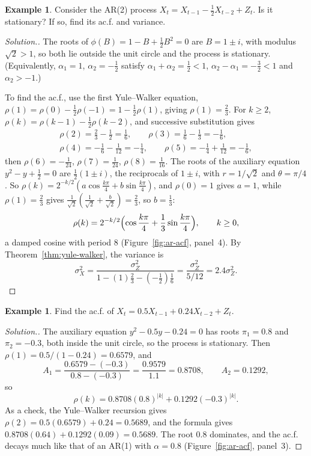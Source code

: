 \documentclass[11pt,a4paper]{article}
\theoremstyle{definition}
\newtheorem{exa}[thm]{Example}
\newenvironment{solution}
  {\renewcommand{\qedsymbol}{}\begin{proof}[\textit{Solution}.]}
  {\end{proof}}
\begin{document}
\begin{exa}\label{exa:ar2-complex}
Consider the AR(2) process $X_t = X_{t-1} - \frac12X_{t-2} + Z_t$. Is it stationary? If so, find its ac.f. and variance.
\end{exa}

\begin{solution}
The roots of $\phi(B) = 1 - B + \frac12B^2 = 0$ are $B = 1 \pm i$, with modulus $\sqrt2 > 1$, so both lie outside the unit circle and the process is
stationary. (Equivalently, $\alpha_1 = 1$, $\alpha_2 = -\frac12$ satisfy $\alpha_1 + \alpha_2 = \frac12 < 1$, $\alpha_2 - \alpha_1 = -\frac32 < 1$ and $\alpha_2 > -1$.)

To find the ac.f., use the first Yule--Walker equation, $\rho(1) = \rho(0) - \frac12\rho(-1) = 1 - \frac12\rho(1)$, giving $\rho(1) = \frac23$. For $k \ge 2$,
$\rho(k) = \rho(k - 1) - \frac12\rho(k - 2)$, and successive substitution gives
\begin{gather*}
\rho(2) = \tfrac23 - \tfrac12 = \tfrac16 , \qquad \rho(3) = \tfrac16 - \tfrac13 = -\tfrac16 , \\
\rho(4) = -\tfrac16 - \tfrac1{12} = -\tfrac14 , \qquad \rho(5) = -\tfrac14 + \tfrac1{12} = -\tfrac16 ,
\end{gather*}
then $\rho(6) = -\frac1{24}$, $\rho(7) = \frac1{24}$, $\rho(8) = \frac1{16}$. The roots of the auxiliary equation $y^2 - y + \frac12 = 0$ are $\frac12(1 \pm i)$, the reciprocals of
$1 \pm i$, with $r = 1/\sqrt2$ and $\theta = \pi/4$. So $\rho(k) = 2^{-k/2}(a\cos\frac{k\pi}4 + b\sin\frac{k\pi}4)$, and $\rho(0) = 1$ gives $a = 1$, while $\rho(1) = \frac23$ gives
$\frac1{\sqrt2}(\frac1{\sqrt2} + \frac b{\sqrt2}) = \frac23$, so $b = \frac13$:
\[
\rho(k) = 2^{-k/2}\Bigl(\cos\frac{k\pi}4 + \frac13\sin\frac{k\pi}4\Bigr) , \qquad k \ge 0 ,
\]
a damped cosine with period $8$ (Figure~\ref{fig:ar-acf}, panel~4). By Theorem~\ref{thm:yule-walker}, the variance is
\[
\sigma_X^2 = \frac{\sigma_Z^2}{1 - (1)\frac23 - (-\frac12)\frac16} = \frac{\sigma_Z^2}{5/12} = 2.4\sigma_Z^2 .
\]
\end{solution}

\begin{exa}\label{exa:ar2-real}
Find the ac.f. of $X_t = 0.5X_{t-1} + 0.24X_{t-2} + Z_t$.
\end{exa}

\begin{solution}
The auxiliary equation $y^2 - 0.5y - 0.24 = 0$ has roots $\pi_1 = 0.8$ and $\pi_2 = -0.3$, both inside the unit circle, so the process is stationary.
Then $\rho(1) = 0.5/(1 - 0.24) = 0.6579$, and
\[
A_1 = \frac{0.6579 - (-0.3)}{0.8 - (-0.3)} = \frac{0.9579}{1.1} = 0.8708 , \qquad A_2 = 0.1292 ,
\]
so
\[
\rho(k) = 0.8708(0.8)^{|k|} + 0.1292(-0.3)^{|k|} .
\]
As a check, the Yule--Walker recursion gives $\rho(2) = 0.5(0.6579) + 0.24 = 0.5689$, and the formula gives $0.8708(0.64) + 0.1292(0.09) = 0.5689$. The
root $0.8$ dominates, and the ac.f. decays much like that of an AR(1) with $\alpha = 0.8$ (Figure~\ref{fig:ar-acf}, panel~3).
\end{solution}
\end{document}

